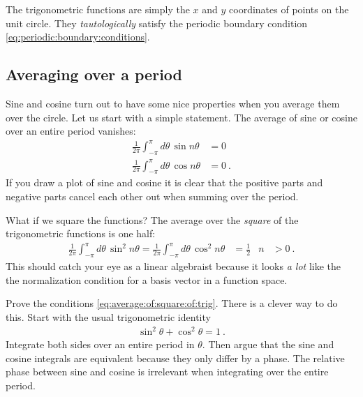 The trigonometric functions are simply the $x$ and $y$ coordinates of points on the unit circle. They \emph{tautologically} satisfy the periodic boundary condition \eqref{eq:periodic:boundary:conditions}. 


\subsection{Averaging over a period}

Sine and cosine turn out to have some nice properties when you average them over the circle.  
%
Let us start with a simple statement. The average of sine or cosine over an entire period vanishes:
\begin{align}
    \frac{1}{2\pi}
    \int_{-\pi}^\pi d\theta\, \sin n\theta 
    &= 0
    \\
    \frac{1}{2\pi}
    \int_{-\pi}^\pi d\theta\, \cos n\theta 
    &= 0
    \ .
\end{align}
If you draw a plot of sine and cosine it is clear that the positive parts and negative parts cancel each other out when summing over the period.

What if we square the functions? The average over the \emph{square} of the trigonometric functions is one half:
\begin{align}
    \frac{1}{2\pi}
    \int_{-\pi}^\pi d\theta\, \sin^2 n\theta 
    =
    \frac{1}{2\pi}
    \int_{-\pi}^\pi d\theta\, \cos^2 n\theta 
    &= \frac{1}{2} 
    &
    n
    &> 0
    \ .
    \label{eq:average:of:square:of:trig}
\end{align}
This should catch your eye as a linear algebraist because it looks \emph{a lot} like the the normalization condition for a basis vector in a function space. 

\begin{exercise}
Prove the conditions \eqref{eq:average:of:square:of:trig}. There is a clever way to do this. Start with the usual trigonometric identity
\begin{align}
    \sin^2\theta + \cos^2\theta = 1 \ .
\end{align}
Integrate both sides over an entire period in $\theta$. Then argue that the sine and cosine integrals are equivalent because they only differ by a phase. The relative phase between sine and cosine is irrelevant when integrating over the entire period. 
\end{exercise}


